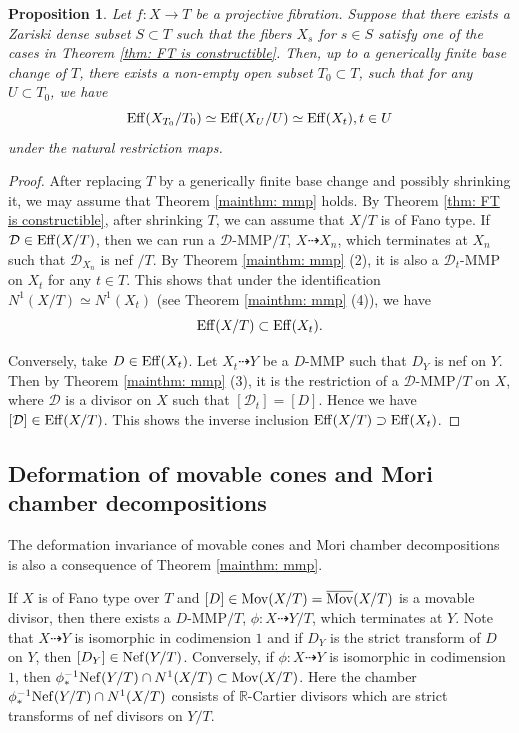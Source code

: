 \documentclass[11pt,oneside,reqno]{amsart}
\numberwithin{equation}{section}
\newtheorem{proposition}{Proposition}[section]
\theoremstyle{definition}
\newcommand{\Nef}{{\rm {Nef}}}
\newcommand{\Eff}{{\rm {Eff}}}
\newcommand{\Mov}{{\rm {Mov}}}
\newcommand{\bMov}{\overline{\rm {Mov}}}
\newcommand{\dto}{\dashrightarrow}
\newcommand{\bR}{\mathbb{R}}
\newcommand{\mD}{\mathcal{D}}
\begin{document}
\begin{proposition}\label{prop: def of eff cone}
Let $f: X \to T$ be a projective fibration. Suppose that there exists a Zariski dense subset $S\subset T$ such that the fibers $X_s$ for $s\in S$ satisfy one of the cases in Theorem \ref{thm: FT is constructible}. Then, up to a generically finite base change of $T$, there exists a non-empty open subset $T_0\subset T$, such that for any $U\subset T_0$, we have
\[
\Eff(X_{T_0}/T_0) \simeq \Eff(X_U/U) \simeq \Eff(X_t), t\in U
\]
 under the natural restriction maps.
\end{proposition}
\begin{proof}
After replacing $T$ by a generically finite base change and possibly shrinking it, we may assume that Theorem \ref{mainthm: mmp} holds. By Theorem \ref{thm: FT is constructible}, after shrinking $T$, we can assume that $X/T$ is of Fano type. If $\mD\in \Eff(X/T)$, then we can run a $\mD$-MMP$/T$, $X \dto X_n$, which terminates at $X_n$ such that $\mD_{X_n}$ is nef $/T$. By Theorem \ref{mainthm: mmp} (2), it is also a $\mD_t$-MMP on $X_t$ for any $t\in T$. This shows that under the identification $N^1(X/T) \simeq N^1(X_t)$ (see Theorem \ref{mainthm: mmp} (4)), we have
\[
\Eff(X/T) \subset \Eff(X_t).
\]

Conversely, take $D\in \Eff(X_t)$. Let $X_t \dasharrow Y$ be a $D$-MMP such that $D_Y$ is nef on $Y$. Then by Theorem \ref{mainthm: mmp} (3), it is the restriction of a $\mD$-MMP$/T$ on $X$, where $\mD$ is a divisor on $X$ such that $[\mD_t]=[D]$. Hence we have $[\mD]\in \Eff(X/T)$. This shows the inverse inclusion $\Eff(X/T) \supset \Eff(X_t)$.
\end{proof}

\subsection{Deformation of movable cones and Mori chamber decompositions}

The deformation invariance of movable cones and Mori chamber decompositions is also a consequence of Theorem \ref{mainthm: mmp}.

If $X$ is of Fano type over $T$ and $[D] \in \Mov(X/T) = \bMov(X/T)$ is a movable divisor, then there exists a $D$-MMP$/T$, $\phi: X \dto Y/T$, which terminates at $Y$. Note that $X \dto Y$ is isomorphic in codimension $1$ and if $D_Y$ is the strict transform of $D$ on $Y$, then $[D_Y]\in \Nef(Y/T)$. 
Conversely, if $\phi: X \dto Y$ is isomorphic in codimension $1$, then $\phi^{-1}_{*}\Nef(Y/T) \cap N^1(X/T) \subset \Mov(X/T)$. Here the chamber $\phi^{-1}_{*}\Nef(Y/T) \cap N^1(X/T)$ consists of $\bR$-Cartier divisors which are strict transforms of nef divisors on $Y/T$. 
\end{document}

